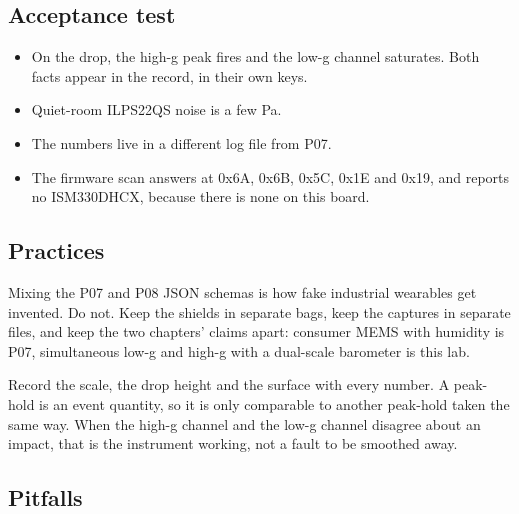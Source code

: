\subsection*{Acceptance test}

\begin{itemize}
\item On the drop, the high-g peak fires and the low-g channel saturates. Both facts appear
in the record, in their own keys.
\item Quiet-room ILPS22QS noise is a few Pa.
\item The numbers live in a different log file from P07.
\item The firmware scan answers at 0x6A, 0x6B, 0x5C, 0x1E and 0x19, and reports no
ISM330DHCX, because there is none on this board.
\end{itemize}

\subsection*{Practices}

Mixing the P07 and P08 JSON schemas is how fake industrial wearables get invented. Do not.
Keep the shields in separate bags, keep the captures in separate files, and keep the two
chapters' claims apart: consumer MEMS with humidity is P07, simultaneous low-g and high-g
with a dual-scale barometer is this lab.

Record the scale, the drop height and the surface with every number. A peak-hold is an
event quantity, so it is only comparable to another peak-hold taken the same way. When the
high-g channel and the low-g channel disagree about an impact, that is the instrument
working, not a fault to be smoothed away.

\subsection*{Pitfalls}

